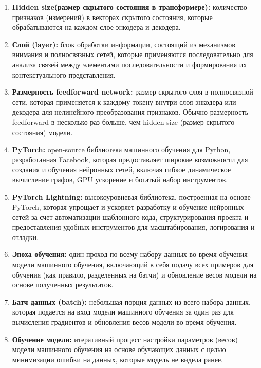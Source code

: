 \begin{enumerate}
    \item  \textbf{Hidden size(размер скрытого состояния в трансформере):} количество признаков (измерений) в векторах скрытого состояния, которые обрабатываются на каждом слое энкодера и декодера. 

    \item  \textbf{Слой (layer):} блок обработки информации, состоящий из механизмов внимания и полносвязных сетей, которые применяются последовательно для анализа связей между элементами последовательности и формирования их контекстуального представления. 

    \item  \textbf{Размерность feedforward network:} размер скрытого слоя в полносвязной сети, которая применяется к каждому токену внутри слоя энкодера или декодера для нелинейного преобразования признаков. Обычно размерность feedforward в несколько раз больше, чем hidden size (размер скрытого состояния) модели. 

    \item  \textbf{PyTorch:} open-source библиотека машинного обучения для Python, разработанная Facebook, которая предоставляет широкие возможности для создания и обучения нейронных сетей, включая гибкое динамическое вычисление графов, GPU ускорение и богатый набор инструментов. 

    \item  \textbf{PyTorch Lightning:} высокоуровневая библиотека, построенная на основе PyTorch, которая упрощает и ускоряет разработку и обучение нейронных сетей за счет автоматизации шаблонного кода, структурирования проекта и предоставления удобных инструментов для масштабирования, логирования и отладки. 

    \item  \textbf{Эпоха обучения:} один проход по всему набору данных во время обучения модели машинного обучения, включающий в себя подачу всех примеров для обучения (как правило, разделенных на батчи) и обновление весов модели на основе полученных результатов.

    \item  \textbf{ Батч данных (batch):} небольшая порция данных из всего набора данных, которая подается на вход модели машинного обучения за один раз для вычисления градиентов и обновления весов модели во время обучения. 

    \item  \textbf{Обучение модели:} итеративный процесс настройки параметров (весов) модели машинного обучения на основе обучающих данных с целью минимизации ошибки на данных, которые модель не видела ранее.
\end{enumerate} 
    

\newpage
